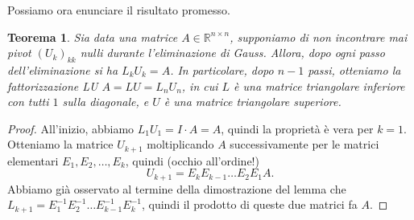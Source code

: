 \documentclass[a4paper]{report}
\newtheorem{theorem}{Teorema}[chapter]
\theoremstyle{definiton}
\theoremstyle{remark}
\begin{document}
Possiamo ora enunciare il risultato promesso.

\begin{theorem}
    Sia data una matrice $A\in\mathbb{R}^{n\times n}$, supponiamo di non incontrare mai pivot $(U_k)_{kk}$ nulli durante l'eliminazione di Gauss. Allora, dopo ogni passo dell'eliminazione si ha $L_k U_k = A$. In particolare, dopo $n-1$ passi, otteniamo la \emph{fattorizzazione LU} $A = LU = L_{n}U_{n}$, in cui $L$ è una matrice triangolare inferiore con tutti $1$ sulla diagonale, e $U$ è una matrice triangolare superiore.
\end{theorem}
\begin{proof}
    All'inizio, abbiamo $L_1 U_1 = I \cdot A = A$, quindi la proprietà è vera per $k=1$. Otteniamo la matrice $U_{k+1}$ moltiplicando $A$ successivamente per le matrici elementari $E_1, E_2,\dots, E_k$, quindi (occhio all'ordine!)
    \[
        U_{k+1} = E_k E_{k-1} \dots E_2 E_1 A.
    \]
    Abbiamo già osservato al termine della dimostrazione del lemma che $L_{k+1} = E_1^{-1} E_2^{-1} \dots E_{k-1}^{-1} E_k^{-1}$, quindi il prodotto di queste due matrici fa $A$.
\end{proof}
\end{document}

